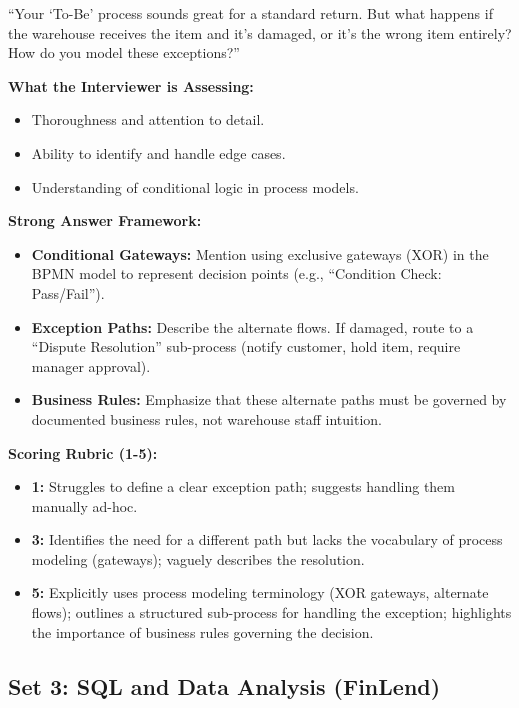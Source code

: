 \documentclass[
  11pt,
  openany,
  oneside]{book}
\providecommand{\tightlist}{%
  \setlength{\itemsep}{0pt}\setlength{\parskip}{0pt}}
\begin{document}
``Your `To-Be' process sounds great for a standard return. But what
happens if the warehouse receives the item and it's damaged, or it's the
wrong item entirely? How do you model these exceptions?''

\textbf{What the Interviewer is Assessing:}

\begin{itemize}
\tightlist
\item
  Thoroughness and attention to detail.
\item
  Ability to identify and handle edge cases.
\item
  Understanding of conditional logic in process models.
\end{itemize}

\textbf{Strong Answer Framework:}

\begin{itemize}
\tightlist
\item
  \textbf{Conditional Gateways:} Mention using exclusive gateways (XOR)
  in the BPMN model to represent decision points (e.g., ``Condition
  Check: Pass/Fail'').
\item
  \textbf{Exception Paths:} Describe the alternate flows. If damaged,
  route to a ``Dispute Resolution'' sub-process (notify customer, hold
  item, require manager approval).
\item
  \textbf{Business Rules:} Emphasize that these alternate paths must be
  governed by documented business rules, not warehouse staff intuition.
\end{itemize}

\textbf{Scoring Rubric (1-5):}

\begin{itemize}
\tightlist
\item
  \textbf{1:} Struggles to define a clear exception path; suggests
  handling them manually ad-hoc.
\item
  \textbf{3:} Identifies the need for a different path but lacks the
  vocabulary of process modeling (gateways); vaguely describes the
  resolution.
\item
  \textbf{5:} Explicitly uses process modeling terminology (XOR
  gateways, alternate flows); outlines a structured sub-process for
  handling the exception; highlights the importance of business rules
  governing the decision.
\end{itemize}

\bigskip

\subsection{Set 3: SQL and Data Analysis
(FinLend)}\label{set-3-sql-and-data-analysis-finlend}
\end{document}
